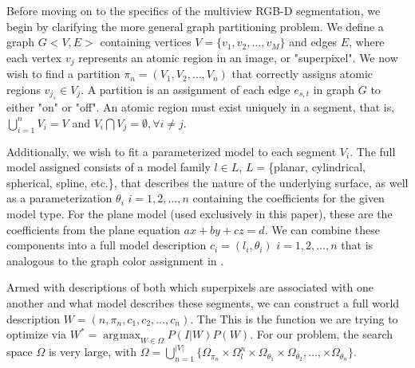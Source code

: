 \documentclass[10pt,letterpaper]{article}
\DeclareMathOperator*{\argmax}{arg\!max}
\begin{document}
	Before moving on to the specifics of the multiview RGB-D segmentation, we begin by clarifying the more general graph partitioning problem. We define a graph $G<V,E>$ containing vertices $V=\{v_1,v_2,\ldots,v_M\}$ and edges $E$, where each vertex $v_j$ represents an atomic region in an image, or "superpixel". We now wish to find a partition $\pi_n=(V_1,V_2,\ldots,V_n)$ that correctly assigns atomic regions  $v_{j_s}\in{V_j}$. A partition is an assignment of each edge $e_{s,t}$ in graph $G$ to either "on" or "off". An atomic region must exist uniquely in a segment, that is, $\bigcup_{i=1}^{n}V_i=V$ and $V_i\bigcap{V_j}=\emptyset,\forall{i}\neq{j}$.
	
	Additionally, we wish to fit a parameterized model to each segment $V_i$. The full model assigned consists of a model family $l\in{L}$,  $L=$\{planar, cylindrical, spherical, spline, etc.\}, that describes the nature of the underlying surface, as well as a parameterization $\theta_i$ $i=1,2,\ldots,n$ containing the coefficients for the given model type. For the plane model (used exclusively in this paper), these are the coefficients from the plane equation $ax+by+cz=d$. We can combine these components into a full model description $c_i=(l_i,\theta_i)$ $i=1,2,\ldots,n$ that is analogous to the graph color assignment in \cite{swendsen1987nonuniversal}.
	
	Armed with descriptions of both which superpixels are associated with one another and what model describes these segments, we can construct a full world description $W=(n,\pi_n,c_1,c_2,\ldots,c_n)$. The  This is the function we are trying to optimize via $W^*={\argmax}_{W\in\Omega} P(I|W)P(W)$. For our problem, the search space $\Omega$ is very large, with $\Omega=\bigcup_{n=1}^{|V|}\{\Omega_{\pi_n} \times\Omega_{l}^n \times\Omega_{\theta_1} \times\Omega_{\theta_2},\ldots, \times\Omega_{\theta_n}\}$.
\end{document}
